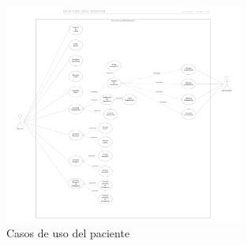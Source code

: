 \begin{figure}[htb]
	\centering
	\includegraphics[width=0.7\textwidth]{images/cap2/casosdeuso}
	\caption{Casos de uso del paciente} \label{fig:casosdeuso}
\end{figure} 




